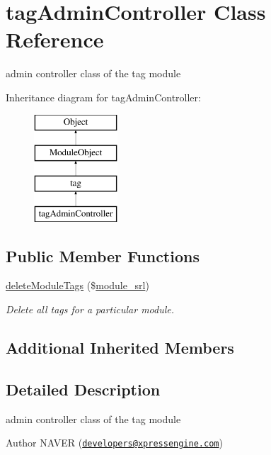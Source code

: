 \hypertarget{classtagAdminController}{}\section{tag\+Admin\+Controller Class Reference}
\label{classtagAdminController}


admin controller class of the tag module  


Inheritance diagram for tag\+Admin\+Controller\+:\begin{figure}[H]
\begin{center}
\leavevmode
\includegraphics[height=4.000000cm]{classtagAdminController}
\end{center}
\end{figure}
\subsection*{Public Member Functions}
\begin{DoxyCompactItemize}
\item 
\hyperlink{classtagAdminController_a26a0cf3fda1e1d57de9810e76dd72765}{delete\+Module\+Tags} (\$\hyperlink{ko_8install_8php_a370bb6450fab1da3e0ed9f484a38b761}{module\+\_\+srl})
\begin{DoxyCompactList}\small\item\em Delete all tags for a particular module. \end{DoxyCompactList}\end{DoxyCompactItemize}
\subsection*{Additional Inherited Members}


\subsection{Detailed Description}
admin controller class of the tag module 

\begin{DoxyAuthor}{Author}
N\+A\+V\+ER (\href{mailto:developers@xpressengine.com}{\tt developers@xpressengine.\+com}) 
\end{DoxyAuthor}


